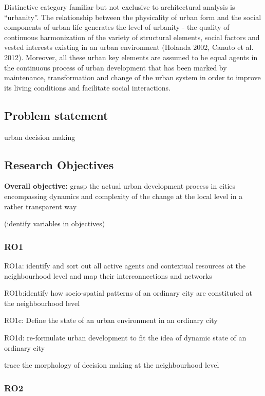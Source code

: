 \documentclass[11pt]{report}
\begin{document}
Distinctive category familiar but not exclusive to architectural analysis is “urbanity”. The relationship between the physicality of urban form and the social components of urban life generates the level of urbanity - the quality of continuous harmonization of the variety of structural elements, social factors and vested interests existing in an urban environment (Holanda 2002, Canuto et al. 2012). Moreover, all these urban key elements are assumed to be equal agents in the continuous process of urban development that has been marked by maintenance, transformation and change of the urban system in order to improve its living conditions and facilitate social interactions.

\subsection{Problem statement}
urban decision making

\subsection{Research Objectives}

\textbf{Overall objective:}
grasp the actual urban development process in cities encompassing dynamics and complexity of the change at the local level in a rather transparent way

(identify variables in objectives)

\subsubsection{RO1}

RO1a: identify and sort out all active agents and contextual resources at the neighbourhood level and map their interconnections and networks 

RO1b:identify how socio-spatial patterns of an ordinary city are constituted at the neighbourhood level

RO1c: Define the state of an urban environment in an ordinary city

RO1d: re-formulate urban development to fit the idea of dynamic state of an ordinary city

trace the morphology of decision making at the neighbourhood level

\subsubsection{RO2}
\end{document}
